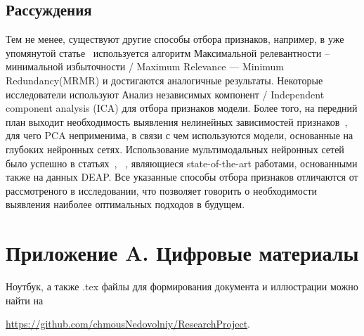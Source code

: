 \documentclass{article}
\begin{document}
\subsection{Рассуждения}
Тем не менее, существуют другие способы отбора признаков, например, в уже упомянутой статье~\cite{Atkinson} используется алгоритм Максимальной релевантности -- минимальной избыточности / Maximum Relevance — Minimum Redundancy(MRMR) и достигаются аналогичные результаты. Некоторые исследователи используют Анализ независимых компонент / Independent component analysis (ICA) для отбора признаков модели. Более того, на передний план выходит необходимость выявления нелинейных зависимостей признаков~\cite{Wang}, для чего PCA неприменима, в связи с чем используются модели, основанные на глубоких нейронных сетях. Использование мультимодальных нейронных сетей было успешно в статьях~\cite{Zhao}, ~\cite{Zheng}, являющиеся state-of-the-art работами, основанными также на данных DEAP. Все указанные способы отбора признаков отличаются от рассмотреного в исследовании, что позволяет говорить о необходимости выявления наиболее оптимальных подходов в будущем.




\section*{Приложение A. Цифровые материалы}
Ноутбук, а также .tex файлы для формирования документа и иллюстрации можно найти на

\url{https://github.com/chmousNedovolniy/ResearchProject}. 
\end{document}
